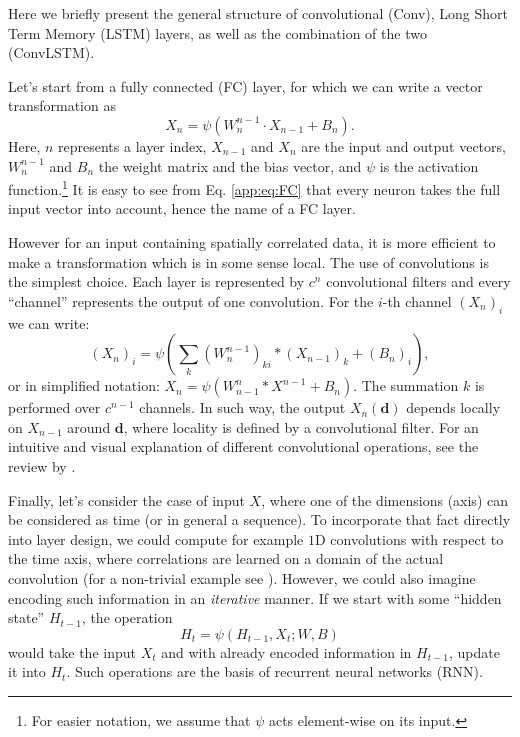 \documentclass[fleqn,usenatbib]{mnras}
\renewcommand{\b}{\mathbf}
\begin{document}
Here we briefly present the general structure of convolutional (Conv), Long Short Term Memory (LSTM) layers, as well as the combination of the two (ConvLSTM).

Let's start from a fully connected (FC) layer, for which we can write a vector transformation as
\begin{equation}
    X_n = \psi ( W_n^{n-1} \cdot X_{n-1} + B_n).
    \label{app:eq:FC}
\end{equation}
Here, $n$ represents a layer index, $X_{n-1}$ and $X_n$ are the input and output vectors, $W_n^{n-1}$ and $B_n$ the weight matrix and the bias vector, and $\psi$ is the activation function.\footnote{For easier notation, we assume that $\psi$ acts element-wise on its input.} 
It is easy to see from Eq. \ref{app:eq:FC} that every neuron takes the full input vector into account, hence the name of a FC layer.

However for an input containing spatially correlated data, it is more efficient to make a transformation which is in some sense local. The use of convolutions is the simplest choice. Each layer is represented by $c^n$ convolutional filters and every \enquote{channel} represents the output of one convolution. For the $i$-th channel $(X_n)_i$ we can write:
\begin{equation}
    (X_n)_i = \psi \left(\sum_{k} (W_n^{n-1})_{ki} * (X_{n-1})_k + (B_n)_i \right),
    \label{app:eq:Conv}
\end{equation}
or in simplified notation: $X_n = \psi(W^n_{n-1} * X^{n-1} + B_n)$. The summation $k$ is performed over $c^{n-1}$ channels. In such way, the output $X_n(\b{d})$ depends locally on $X_{n-1}$ around $\b{d}$, where locality is defined by a convolutional filter. For an intuitive and visual explanation of different convolutional operations, see the review by \cite{dumoulin16}.

Finally, let's consider the case of input $X$, where one of the dimensions (axis) can be considered as time (or in general a sequence). To incorporate that fact directly into layer design, we could compute for example $1\mathrm{D}$ convolutions with respect to the time axis, where correlations are learned on a domain of the actual convolution (for a non-trivial example see \citealt{WaveNet}). However, we could also imagine encoding such information in an {\it iterative} manner. If we start with some \enquote{hidden state} $H_{t-1}$, the operation
\begin{equation}
    H_{t} = \psi (H_{t-1}, X_t; W, B)
    \label{app:eq:RNN}
\end{equation}
would take the input $X_t$ and with already encoded information in $H_{t-1}$, update it into $H_t$. Such operations are the basis of recurrent neural networks (RNN).  
\end{document}
